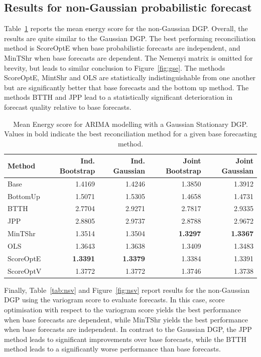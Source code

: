 \documentclass[12pt]{article}
\theoremstyle{definition}
\begin{document}
\subsection{Results for non-Gaussian probabilistic forecast} \label{sec:SimSamplingResults}

Table~\ref{tab:nse} reports the mean energy score for the non-Gaussian DGP.  Overall, the results are quite similar to the Gaussian DGP.  The best performing reconciliation method is ScoreOptE when base probabilistic forecasts are independent, and MinTShr when base forecasts are dependent.  The Nemenyi matrix is omitted for brevity, but leads to similar conclusion to Figure~\ref{fig:gse}. The methods ScoreOptE, MintShr and OLS are statistically indistinguishable from one another but are significantly better that base forecasts and the bottom up method.  The methods BTTH and JPP lead to a statistically significant deterioration in forecast quality relative to base forecasts. 

\begin{table}[H]	
	\caption{\label{tab:nse} Mean Energy score for ARIMA 
		modelling with a Gaussian Stationary DGP.  Values in bold indicate the best reconciliation method for a given base forecasting method.}
	\centering
	\begin{tabular}[t]{l|r|r|r|r}
		\hline
		Method & Ind. Bootstrap & Ind. Gaussian & Joint Bootstrap & Joint Gaussian\\
		\hline
		Base & 1.4169 & 1.4246 & 1.3850 & 1.3912\\
		\hline
		BottomUp & 1.5071 & 1.5305 & 1.4658 & 1.4731\\
		\hline
		BTTH & 2.7704 & 2.9271 & 2.7817 & 2.9335\\
		\hline
		JPP & 2.8805 & 2.9737 & 2.8788 & 2.9672\\
		\hline
		MinTShr & 1.3514 & 1.3504 & \textbf{1.3297} & \textbf{1.3367}\\
		\hline
		OLS & 1.3643 & 1.3638 & 1.3409 & 1.3483\\
		\hline
		ScoreOptE & \textbf{1.3391} & \textbf{1.3379} & 1.3384 & 1.3391\\
		\hline
		ScoreOptV & 1.3772 & 1.3772 & 1.3746 & 1.3738\\
		\hline
	\end{tabular}
\end{table}

Finally, Table~\ref{tab:nsv} and Figure~\ref{fig:nsv} report results for the non-Gaussian DGP using the variogram score to evaluate forecasts.  In this case, score optimisation with respect to the variogram score yields the best performance when base forecasts are dependent, while MinTShr yields the best performance when base forecasts are independent.  In contrast to the Gaussian DGP, the JPP method leads to significant improvements over base forecasts, while the BTTH method leads to a significantly worse performance than base forecasts.
\end{document}
